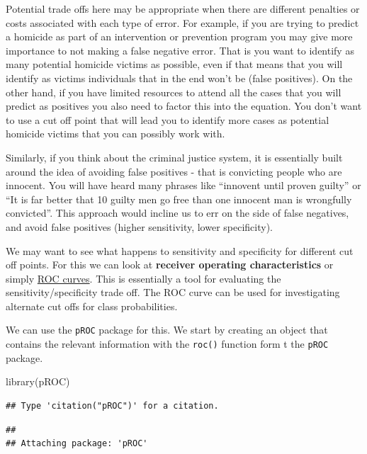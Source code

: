 \documentclass[
]{book}
\newenvironment{Shaded}{\begin{snugshade}}{\end{snugshade}}
\newcommand{\FunctionTok}[1]{\textcolor[rgb]{0.00,0.00,0.00}{#1}}
\newcommand{\NormalTok}[1]{#1}
\begin{document}
Potential trade offs here may be appropriate when there are different penalties or costs associated with each type of error. For example, if you are trying to predict a homicide as part of an intervention or prevention program you may give more importance to not making a false negative error. That is you want to identify as many potential homicide victims as possible, even if that means that you will identify as victims individuals that in the end won't be (false positives). On the other hand, if you have limited resources to attend all the cases that you will predict as positives you also need to factor this into the equation. You don't want to use a cut off point that will lead you to identify more cases as potential homicide victims that you can possibly work with.

Similarly, if you think about the criminal justice system, it is essentially built around the idea of avoiding false positives - that is convicting people who are innocent. You will have heard many phrases like ``innovent until proven guilty'' or ``It is far better that 10 guilty men go free than one innocent man is wrongfully convicted''. This approach would incline us to err on the side of false negatives, and avoid false positives (higher sensitivity, lower specificity).

We may want to see what happens to sensitivity and specificity for different cut off points. For this we can look at \textbf{receiver operating characteristics} or simply \href{http://en.wikipedia.org/wiki/Receiver_operating_characteristic}{ROC curves}. This is essentially a tool for evaluating the sensitivity/specificity trade off. The ROC curve can be used for investigating alternate cut offs for class probabilities.

We can use the \texttt{pROC} package for this. We start by creating an object that contains the relevant information with the \texttt{roc()} function form t the \texttt{pROC} package.

\begin{Shaded}
\begin{Highlighting}[]
\FunctionTok{library}\NormalTok{(pROC)}
\end{Highlighting}
\end{Shaded}

\begin{verbatim}
## Type 'citation("pROC")' for a citation.
\end{verbatim}

\begin{verbatim}
## 
## Attaching package: 'pROC'
\end{verbatim}
\end{document}
